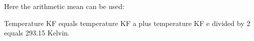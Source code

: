 Here the arithmetic mean can be used:

Temperature KF equals temperature KF a plus temperature KF e divided by 2 equals 293.15 Kelvin.